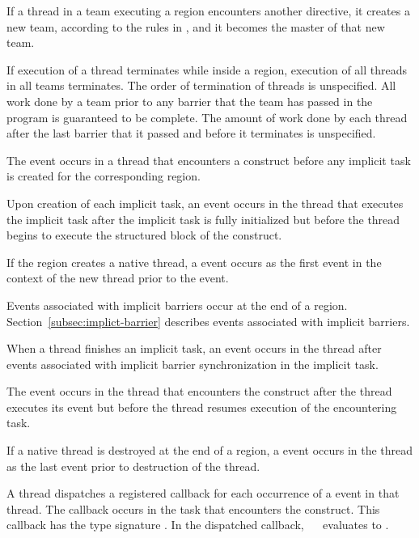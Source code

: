 If a thread in a team executing a  region encounters another 
directive, it creates a new team, according to the rules in
,
and it becomes the master of that new team.

If execution of a thread terminates while inside a  region, execution of all
threads in all teams terminates. The order of termination of threads is unspecified. All
work done by a team prior to any barrier that the team has passed in the program is
guaranteed to be complete. The amount of work done by each thread after the last
barrier that it passed and before it terminates is unspecified.

\events

The  event occurs in a thread that encounters a
 construct before any implicit task is created for the
corresponding  region.

Upon creation of each implicit task, an  event
occurs in the thread that executes the implicit task after the implicit
task is fully initialized but before the thread begins to execute the
structured block of the  construct.

If the  region creates a native thread, a 
event occurs as the first event in the context of the new thread prior to the 
 event.

Events associated with implicit barriers occur at the end of a
 region. Section~\ref{subsec:implict-barrier} describes events
associated with implicit barriers.

When a thread finishes an implicit task, an 
event occurs in the thread after events associated with implicit
barrier synchronization in the implicit task.

The  event occurs in the thread that encounters the
 construct after the thread executes its  
event but before the thread resumes execution of the encountering task.

If a native thread is destroyed at the end of a  region, a
 event occurs in the thread as the last event prior 
to destruction of the thread.

\tools

A thread dispatches a registered 
callback for each occurrence of a  event in that
thread.  The callback occurs in the task that encounters the 
 construct.  This callback has the type signature
. In the dispatched callback, 
~\code{&}~ evaluates to .

